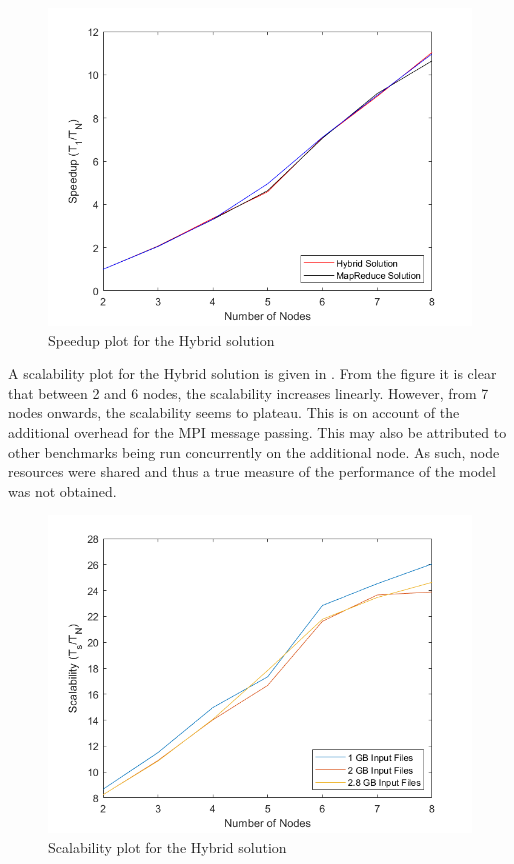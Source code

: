 \documentclass[12pt,twocolumn]{witseiepaper}
\begin{document}
\begin{figure}[h]
	\centering
	\includegraphics[width=1\columnwidth]{hybrid-speedup.png}
	\caption{Speedup plot for the Hybrid solution}
	\raggedright
	\label{fig:speedUpH}	
\end{figure}

A scalability plot for the Hybrid solution is given in . From the figure it is clear that between 2 and 6 nodes, the scalability increases linearly. However, from 7 nodes onwards, the scalability seems to plateau. This is on account of the additional overhead for the MPI message passing. This may also be attributed to other benchmarks being run concurrently on the additional node. As such, node resources were shared and thus a true measure of the performance of the model was not obtained.

\begin{figure}[h]
	\centering
	\includegraphics[width=1\columnwidth]{scalability.png}
	\caption{Scalability plot for the Hybrid solution}
	\raggedright
	\label{fig:scalabilty}	
\end{figure}
\end{document}
